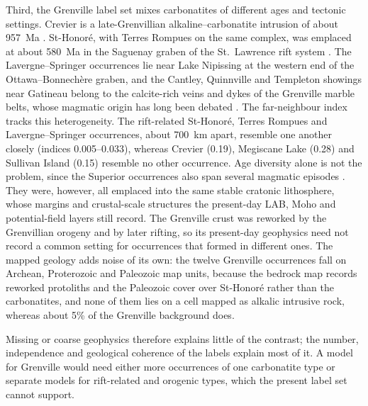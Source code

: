 \documentclass[pdflatex,sn-apa]{sn-jnl}
\begin{document}
Third, the Grenville label set mixes carbonatites of different ages and tectonic settings. Crevier is a late-Grenvillian alkaline--carbonatite intrusion of about 957~Ma \citep{Groulier2020}. St-Honoré, with Terres Rompues on the same complex, was emplaced at about 580~Ma in the Saguenay graben of the St.~Lawrence rift system \citep{Neron2018}. The Lavergne--Springer occurrences lie near Lake Nipissing at the western end of the Ottawa--Bonnech\`ere graben, and the Cantley, Quinnville and Templeton showings near Gatineau belong to the calcite-rich veins and dykes of the Grenville marble belts, whose magmatic origin has long been debated \citep{Moecher1997}. The far-neighbour index tracks this heterogeneity. The rift-related St-Honoré, Terres Rompues and Lavergne--Springer occurrences, about 700~km apart, resemble one another closely (indices 0.005--0.033), whereas Crevier (0.19), Megiscane Lake (0.28) and Sullivan Island (0.15) resemble no other occurrence. Age diversity alone is not the problem, since the Superior occurrences also span several magmatic episodes \citep{Rukhlov2010}. They were, however, all emplaced into the same stable cratonic lithosphere, whose margins and crustal-scale structures the present-day LAB, Moho and potential-field layers still record. The Grenville crust was reworked by the Grenvillian orogeny and by later rifting, so its present-day geophysics need not record a common setting for occurrences that formed in different ones. The mapped geology adds noise of its own: the twelve Grenville occurrences fall on Archean, Proterozoic and Paleozoic map units, because the bedrock map records reworked protoliths and the Paleozoic cover over St-Honoré rather than the carbonatites, and none of them lies on a cell mapped as alkalic intrusive rock, whereas about 5\% of the Grenville background does.

Missing or coarse geophysics therefore explains little of the contrast; the number, independence and geological coherence of the labels explain most of it. A model for Grenville would need either more occurrences of one carbonatite type or separate models for rift-related and orogenic types, which the present label set cannot support.
\end{document}
